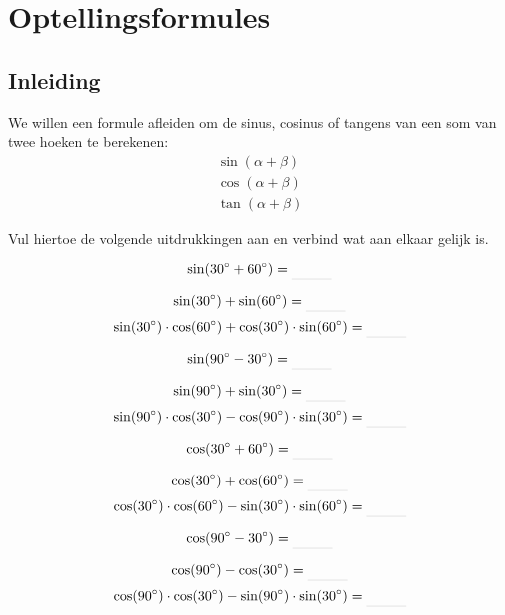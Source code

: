 \documentclass[twoside,a4paper,12pt]{article}
\begin{document}
\pagebreak
\section{Optellingsformules}

\subsection{Inleiding}
We willen een formule afleiden om de sinus, cosinus of tangens van een som van twee hoeken te berekenen:
\begin{align*}
  \sin(\alpha + \beta)\\
  \cos(\alpha + \beta)\\
  \tan(\alpha+\beta)
\end{align*}

Vul hiertoe de volgende uitdrukkingen aan en verbind wat aan elkaar gelijk is.

\begin{minipage}{0.4\textwidth}
  $$\sin(30\degree + 60\degree)=\arule{1cm}$$
\end{minipage}
\begin{minipage}{0.5\textwidth}
  $$\sin(30\degree) + \sin(60\degree)=\arule{1cm}$$
  $$\sin(30\degree)\cdot\cos(60\degree)+\cos(30\degree)\cdot\sin(60\degree)=\arule{1cm}$$
\end{minipage}

\begin{minipage}{0.4\textwidth}
  $$\sin(90\degree - 30\degree)=\arule{1cm}$$
\end{minipage}
\begin{minipage}{0.5\textwidth}
  $$\sin(90\degree) + \sin(30\degree)=\arule{1cm}$$
  $$\sin(90\degree)\cdot\cos(30\degree)-\cos(90\degree)\cdot\sin(30\degree)=\arule{1cm}$$
\end{minipage}

\begin{minipage}{0.4\textwidth}
  $$\cos(30\degree + 60\degree)=\arule{1cm}$$
\end{minipage}
\begin{minipage}{0.5\textwidth}
  $$\cos(30\degree) + \cos(60\degree)=\arule{1cm}$$
  $$\cos(30\degree)\cdot\cos(60\degree)-\sin(30\degree)\cdot\sin(60\degree)=\arule{1cm}$$
\end{minipage}

\begin{minipage}{0.4\textwidth}
  $$\cos(90\degree - 30\degree)=\arule{1cm}$$
\end{minipage}
\begin{minipage}{0.5\textwidth}
  $$\cos(90\degree) - \cos(30\degree)=\arule{1cm}$$
  $$\cos(90\degree)\cdot\cos(30\degree)-\sin(90\degree)\cdot\sin(30\degree)=\arule{1cm}$$
\end{minipage}
\end{document}
